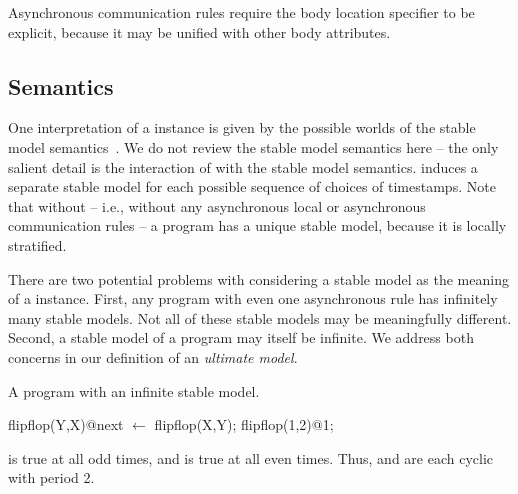 Asynchronous communication rules require the body location specifier to be explicit, because it may be unified with other body attributes.





\subsection{Semantics}
One interpretation of a \lang instance is given by the possible worlds of the
stable model semantics~\cite{stable-model}.  We do not review the stable model
semantics here -- the only salient detail is the interaction of 
with the stable model semantics.   induces a separate stable
model for each possible sequence of choices  of timestamps.  Note that without
 -- i.e., without any asynchronous local or asynchronous
communication rules -- a \lang program has a unique stable model, because it is
locally stratified. 

There are two potential problems with considering a stable model as the meaning of a \lang instance.  
First, any program with even one asynchronous rule has infinitely many stable models.  
Not all of these stable models may be meaningfully different.  Second, a stable model of a \lang program may itself be infinite.  We address both concerns in our definition of an {\em ultimate model}.


\begin{example}
\label{ex:flipflop}
A \lang program with an infinite stable model.

\begin{Dedalus}
flipflop(Y,X)@next \(\leftarrow\) flipflop(X,Y);
flipflop(1,2)@1;
\end{Dedalus}

 is true at all odd times, and  is true at all even times.  Thus,  and  are each cyclic with period 2.
\end{example}


